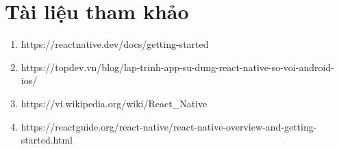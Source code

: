 \section{Tài liệu tham khảo}
\begin{enumerate}
\item https://reactnative.dev/docs/getting-started
\item https://topdev.vn/blog/lap-trinh-app-su-dung-react-native-so-voi-android-ios/
\item https://vi.wikipedia.org/wiki/React\_Native
\item https://reactguide.org/react-native/react-native-overview-and-getting-started.html
\end{enumerate}




